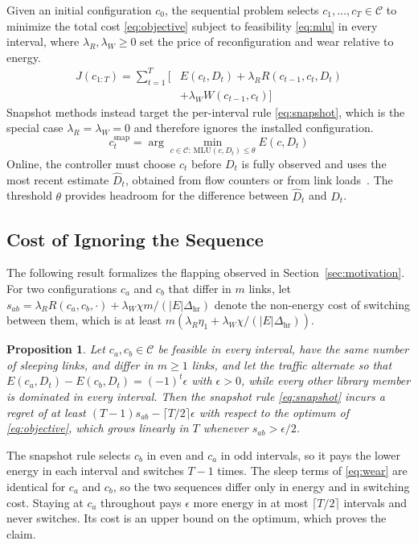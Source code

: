 \documentclass[journal]{IEEEtran}
\newtheorem{proposition}{Proposition}
\begin{document}
Given an initial configuration $c_0$, the sequential problem selects $c_1,\dots,c_T\in\mathcal{C}$ to minimize the total cost \eqref{eq:objective} subject to feasibility \eqref{eq:mlu} in every interval, where $\lambda_R,\lambda_W\ge 0$ set the price of reconfiguration and wear relative to energy.
\begin{equation}\label{eq:objective}
\begin{split}J(c_{1:T})=\sum_{t=1}^{T}\Big[&E(c_t,D_t)+\lambda_R R(c_{t-1},c_t,D_t)\\
&+\lambda_W W(c_{t-1},c_t)\Big]\end{split}
\end{equation}
Snapshot methods instead target the per-interval rule \eqref{eq:snapshot}, which is the special case $\lambda_R=\lambda_W=0$ and therefore ignores the installed configuration.
\begin{equation}\label{eq:snapshot}
c^{\mathrm{snap}}_t=\arg\min_{c\in\mathcal{C}:\,\mathrm{MLU}(c,D_t)\le\theta}E(c,D_t)
\end{equation}
Online, the controller must choose $c_t$ before $D_t$ is fully observed and uses the most recent estimate $\hat{D}_t$, obtained from flow counters or from link loads~\cite{zhang2003tomogravity}. The threshold $\theta$ provides headroom for the difference between $\hat{D}_t$ and $D_t$.

\subsection{Cost of Ignoring the Sequence}

The following result formalizes the flapping observed in Section~\ref{sec:motivation}. For two configurations $c_a$ and $c_b$ that differ in $m$ links, let $s_{ab}=\lambda_R R(c_a,c_b,\cdot)+\lambda_W\chi m/(|E|\Delta_{\mathrm{hr}})$ denote the non-energy cost of switching between them, which is at least $m(\lambda_R\eta_1+\lambda_W\chi/(|E|\Delta_{\mathrm{hr}}))$.

\begin{proposition}\label{prop:snapshot}
Let $c_a,c_b\in\mathcal{C}$ be feasible in every interval, have the same number of sleeping links, and differ in $m\ge 1$ links, and let the traffic alternate so that $E(c_a,D_t)-E(c_b,D_t)=(-1)^t\epsilon$ with $\epsilon>0$, while every other library member is dominated in every interval. Then the snapshot rule \eqref{eq:snapshot} incurs a regret of at least $(T-1)s_{ab}-\lceil T/2\rceil\epsilon$ with respect to the optimum of \eqref{eq:objective}, which grows linearly in $T$ whenever $s_{ab}>\epsilon/2$.
\end{proposition}
\begin{IEEEproof}
The snapshot rule selects $c_b$ in even and $c_a$ in odd intervals, so it pays the lower energy in each interval and switches $T-1$ times. The sleep terms of \eqref{eq:wear} are identical for $c_a$ and $c_b$, so the two sequences differ only in energy and in switching cost. Staying at $c_a$ throughout pays $\epsilon$ more energy in at most $\lceil T/2\rceil$ intervals and never switches. Its cost is an upper bound on the optimum, which proves the claim.
\end{IEEEproof}
\end{document}
